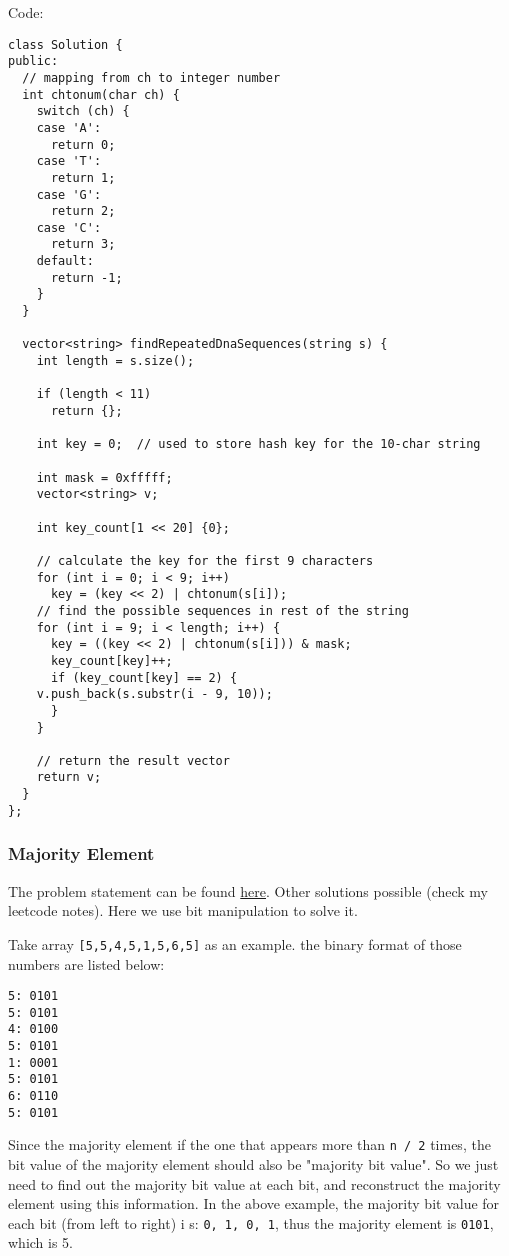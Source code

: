 \documentclass[12pt]{article}
\begin{document}
Code:
\begin{verbatim}
class Solution {
public:
  // mapping from ch to integer number
  int chtonum(char ch) {
    switch (ch) {
    case 'A':
      return 0;
    case 'T':
      return 1;
    case 'G':
      return 2;
    case 'C':
      return 3;
    default:
      return -1;
    }
  }

  vector<string> findRepeatedDnaSequences(string s) {
    int length = s.size();

    if (length < 11)
      return {};

    int key = 0;  // used to store hash key for the 10-char string

    int mask = 0xfffff;
    vector<string> v;

    int key_count[1 << 20] {0};  

    // calculate the key for the first 9 characters
    for (int i = 0; i < 9; i++)
      key = (key << 2) | chtonum(s[i]);
    // find the possible sequences in rest of the string
    for (int i = 9; i < length; i++) {
      key = ((key << 2) | chtonum(s[i])) & mask;
      key_count[key]++;
      if (key_count[key] == 2) {
	v.push_back(s.substr(i - 9, 10));
      }
    }

    // return the result vector
    return v;       
  }
};
\end{verbatim}
\subsubsection{Majority Element}
\label{sec:org7b82b9a}
The problem statement can be found \href{https://leetcode.com/problems/majority-element/}{here}. Other solutions possible (check my leetcode notes). Here we use bit manipulation to solve it.

Take array \texttt{[5,5,4,5,1,5,6,5]} as an example. the binary format of those numbers are listed below:
\begin{verbatim}
5: 0101
5: 0101
4: 0100
5: 0101
1: 0001
5: 0101
6: 0110
5: 0101
\end{verbatim}
Since the majority element if the one that appears more than \texttt{n / 2} times, the bit value of the majority element should also be "majority bit value". So we just need to find out the majority bit value at each bit, and reconstruct the majority element using this information. In the above example, the majority bit value for each bit (from left to right) i
s: \texttt{0, 1, 0, 1}, thus the majority element is \texttt{0101}, which is 5.
\end{document}
